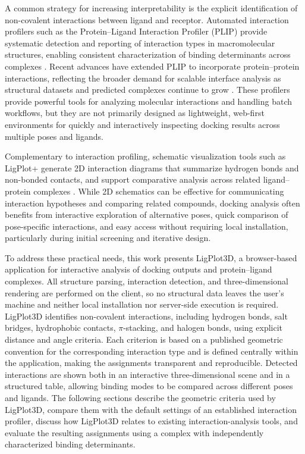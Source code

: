 \documentclass[journal=jacsat,manuscript=article]{achemso}
\begin{document}
A common strategy for increasing interpretability is the explicit identification of non-covalent interactions between ligand and receptor. Automated interaction profilers such as the Protein--Ligand Interaction Profiler (PLIP) provide systematic detection and reporting of interaction types in macromolecular structures, enabling consistent characterization of binding determinants across complexes \cite{salentin2015plip}. Recent advances have extended PLIP to incorporate protein--protein interactions, reflecting the broader demand for scalable interface analysis as structural datasets and predicted complexes continue to grow \cite{schake2025plip}. These profilers provide powerful tools for analyzing molecular interactions and handling batch workflows, but they are not primarily designed as lightweight, web-first environments for quickly and interactively inspecting docking results across multiple poses and ligands.


Complementary to interaction profiling, schematic visualization tools such as LigPlot+ generate 2D interaction diagrams that summarize hydrogen bonds and non-bonded contacts, and support comparative analysis across related ligand--protein complexes \cite{laskowski2011ligplot+}. While 2D schematics can be effective for communicating interaction hypotheses and comparing related compounds, docking analysis often benefits from interactive exploration of alternative poses, quick comparison of pose-specific interactions, and easy access without requiring local installation, particularly during initial screening and iterative design.


To address these practical needs, this work presents LigPlot3D, a browser-based application for interactive analysis of docking outputs and protein--ligand complexes. All structure parsing, interaction detection, and three-dimensional rendering are performed on the client, so no structural data leaves the user's machine and neither local installation nor server-side execution is required. LigPlot3D identifies non-covalent interactions, including hydrogen bonds, salt bridges, hydrophobic contacts, $\pi$-stacking, and halogen bonds, using explicit distance and angle criteria. Each criterion is based on a published geometric convention for the corresponding interaction type and is defined centrally within the application, making the assignments transparent and reproducible. Detected interactions are shown both in an interactive three-dimensional scene and in a structured table, allowing binding modes to be compared across different poses and ligands. The following sections describe the geometric criteria used by LigPlot3D, compare them with the default settings of an established interaction profiler, discuss how LigPlot3D relates to existing interaction-analysis tools, and evaluate the resulting assignments using a complex with independently characterized binding determinants.
\end{document}
